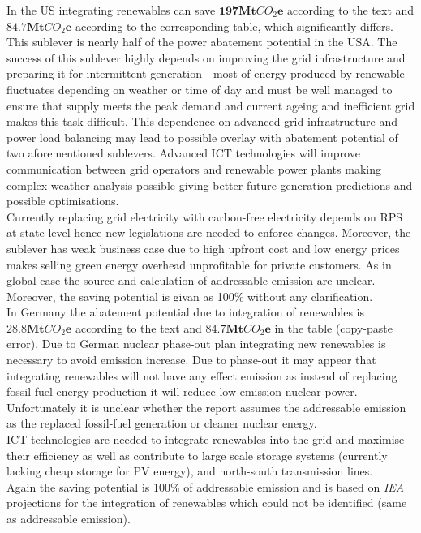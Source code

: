 \documentclass[11pt, twocolumn]{article}
\begin{document}
In the US integrating renewables can save $\mathbf{197} \mathbf{Mt}CO_2\mathbf{e}$ according to the text and $\mathbf{84.7} \mathbf{Mt}CO_2\mathbf{e}$ according to the corresponding table, which significantly differs. This sublever is nearly half of the power abatement potential in the USA. The success of this sublever highly depends on improving the grid infrastructure and preparing it for intermittent generation---most of energy produced by renewable fluctuates depending on weather or time of day and must be well managed to ensure that supply meets the peak demand and current ageing and inefficient grid makes this task difficult. This dependence on advanced grid infrastructure and power load balancing may lead to possible overlay with abatement potential of two aforementioned sublevers. Advanced ICT technologies will improve communication between grid operators and renewable power plants making complex weather analysis possible giving better future generation predictions and possible optimisations.\\
Currently replacing grid electricity with carbon-free electricity depends on RPS at state level hence new legislations are needed to enforce changes. Moreover, the sublever has weak business case due to high upfront cost and low energy prices makes selling green energy overhead unprofitable for private customers. As in global case the source and calculation of addressable emission are unclear. Moreover, the saving potential is givan as 100\% without any clarification.\\

In Germany the abatement potential due to integration of renewables is $\mathbf{28.8} \mathbf{Mt}CO_2\mathbf{e}$ according to the text and $\mathbf{84.7} \mathbf{Mt}CO_2\mathbf{e}$ in the table (copy-paste error). Due to German nuclear phase-out plan integrating new renewables is necessary to avoid emission increase. Due to phase-out it may appear that integrating renewables will not have any effect emission as instead of replacing fossil-fuel energy production it will reduce low-emission nuclear power. Unfortunately it is unclear whether the report assumes the addressable emission as the replaced fossil-fuel generation or cleaner nuclear energy.\\
ICT technologies are needed to integrate renewables into the grid and maximise their efficiency as well as contribute to large scale storage systems (currently lacking cheap storage for PV energy), and north-south transmission lines.\\
Again the saving potential is 100\% of addressable emission and is based on \emph{IEA} projections for the integration of renewables which could not be identified (same as addressable emission).\\
\end{document}
